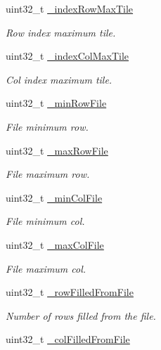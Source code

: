 \begin{DoxyCompactItemize}
uint32\+\_\+t \hyperlink{classfi_1_1HTGSViewRequestData_aedd1b2ef1fda2551d20d09cb147a7a5b}{\+\_\+index\+Row\+Max\+Tile}
\begin{DoxyCompactList}\small\item\em Row index maximum tile. \end{DoxyCompactList}\item 
uint32\+\_\+t \hyperlink{classfi_1_1HTGSViewRequestData_a13bfb6e60a234d945cadf9ba82195998}{\+\_\+index\+Col\+Max\+Tile}
\begin{DoxyCompactList}\small\item\em Col index maximum tile. \end{DoxyCompactList}\item 
uint32\+\_\+t \hyperlink{classfi_1_1HTGSViewRequestData_a85ae18545524100b689b98b32b50066d}{\+\_\+min\+Row\+File}
\begin{DoxyCompactList}\small\item\em File minimum row. \end{DoxyCompactList}\item 
uint32\+\_\+t \hyperlink{classfi_1_1HTGSViewRequestData_ae19d6bacddf2e2d15fe05f295d5eea6d}{\+\_\+max\+Row\+File}
\begin{DoxyCompactList}\small\item\em File maximum row. \end{DoxyCompactList}\item 
uint32\+\_\+t \hyperlink{classfi_1_1HTGSViewRequestData_a8a9272daf2997fea8e6d3088e9030f10}{\+\_\+min\+Col\+File}
\begin{DoxyCompactList}\small\item\em File minimum col. \end{DoxyCompactList}\item 
uint32\+\_\+t \hyperlink{classfi_1_1HTGSViewRequestData_a81d0f293143703e48725346d8e7996c2}{\+\_\+max\+Col\+File}
\begin{DoxyCompactList}\small\item\em File maximum col. \end{DoxyCompactList}\item 
uint32\+\_\+t \hyperlink{classfi_1_1HTGSViewRequestData_a0f7402345a2a1af6c042af8e57c48f13}{\+\_\+row\+Filled\+From\+File}
\begin{DoxyCompactList}\small\item\em Number of rows filled from the file. \end{DoxyCompactList}\item 
uint32\+\_\+t \hyperlink{classfi_1_1HTGSViewRequestData_ac78802f9e701d9f0ce98f4901362e36f}{\+\_\+col\+Filled\+From\+File}

\end{DoxyCompactItemize}
